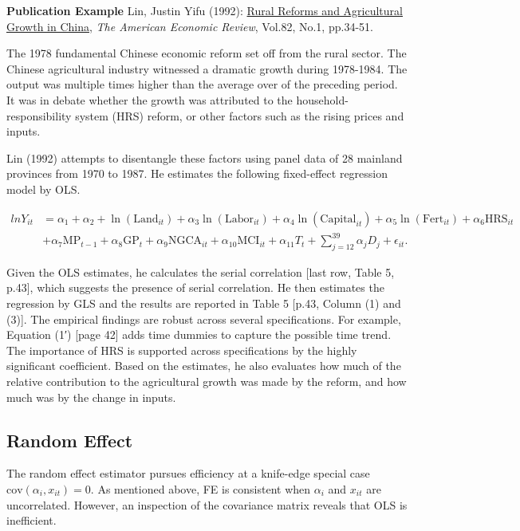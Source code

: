 \documentclass[11pt]{article}
\begin{document}
    \textbf{Publication Example} Lin, Justin Yifu (1992):
\href{http://www.jstor.org/stable/2117601}{Rural Reforms and
Agricultural Growth in China}, \emph{The American Economic Review},
Vol.82, No.1, pp.34-51.

The 1978 fundamental Chinese economic reform set off from the rural
sector. The Chinese agricultural industry witnessed a dramatic growth
during 1978-1984. The output was multiple times higher than the average
over of the preceding period. It was in debate whether the growth was
attributed to the household-responsibility system (HRS) reform, or other
factors such as the rising prices and inputs.

Lin (1992) attempts to disentangle these factors using panel data of 28
mainland provinces from 1970 to 1987. He estimates the following
fixed-effect regression model by OLS.

\[
\begin{aligned}
ln Y_{it} & = \alpha_1 + \alpha_2
+ \ln(\mathrm{Land}_{it}) + \alpha_3 \ln (\mathrm{Labor}_{it}) +
\alpha_4 \ln (\mathrm{Capital}_{it}) + \alpha_5 \ln
(\mathrm{Fert}_{it} ) + \alpha_6 \mathrm{HRS}_{it} \\ 
 & +
\alpha_7 \mbox{MP}_{t-1} 
+ \alpha_8 \mathrm{GP}_t + \alpha_9
\mbox{NGCA}_{it} + \alpha_{10} \mbox{MCI}_{it} + \alpha_{11}
T_t + \sum_{j=12}^{39} \alpha_{j} D_j +
\epsilon_{it}.
\end{aligned}\]

Given the OLS estimates, he calculates the serial correlation {[}last
row, Table 5, p.43{]}, which suggests the presence of serial
correlation. He then estimates the regression by GLS and the results are
reported in Table 5 {[}p.43, Column (1) and (3){]}. The empirical
findings are robust across several specifications. For example, Equation
(1′) {[}page 42{]} adds time dummies to capture the possible time trend.
The importance of HRS is supported across specifications by the highly
significant coefficient. Based on the estimates, he also evaluates how
much of the relative contribution to the agricultural growth was made by
the reform, and how much was by the change in inputs.

    \subsection{Random Effect}\label{random-effect}

The random effect estimator pursues efficiency at a knife-edge special
case \(\mathrm{cov}\left(\alpha_{i},x_{it}\right)=0\). As mentioned
above, FE is consistent when \(\alpha_{i}\) and \(x_{it}\) are
uncorrelated. However, an inspection of the covariance matrix reveals
that OLS is inefficient.
\end{document}
